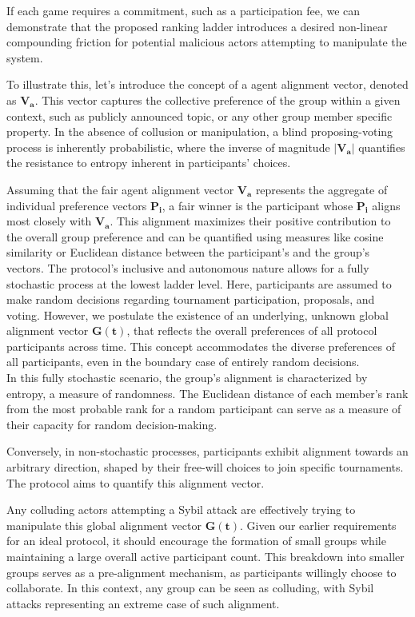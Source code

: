 \documentclass{article}
\begin{document}
\begin{CJK}{UTF8}{gbsn}
\begin{multicols}{2}
        If each game requires a commitment, such as a participation fee, we can demonstrate that the proposed ranking ladder introduces a desired non-linear compounding friction for potential malicious actors attempting to manipulate the system.

        To illustrate this, let's introduce the concept of a agent alignment vector, denoted as  $\mathbf{V_a}$. This vector captures the collective preference of the group within a given context, such as publicly announced topic, or any other group member specific property. In the absence of collusion or manipulation, a blind proposing-voting process is inherently probabilistic, where the inverse of magnitude $|\mathbf{V_a}|$ quantifies the resistance to entropy inherent in participants' choices.

        Assuming that the fair agent alignment vector $\mathbf{V_a}$  represents the aggregate of individual preference vectors $\mathbf{P_i}$, a fair winner is the participant whose  $\mathbf{P_i}$ aligns most closely with $\mathbf{V_a}$. This alignment maximizes their positive contribution to the overall group preference and can be quantified using measures like cosine similarity or Euclidean distance between the participant's and the group's vectors.
        The protocol's inclusive and autonomous nature allows for a fully stochastic process at the lowest ladder level. Here, participants are assumed to make random decisions regarding tournament participation, proposals, and voting.
        However, we postulate the existence of an underlying, unknown global alignment vector $\mathbf{G(t)}$, that reflects the overall preferences of all protocol participants across time. This concept accommodates the diverse preferences of all participants, even in the boundary case of entirely random decisions.\\
        In this fully stochastic scenario, the group's alignment is characterized by entropy, a measure of randomness. The Euclidean distance of each member's rank from the most probable rank for a random participant can serve as a measure of their capacity for random decision-making.

        Conversely, in non-stochastic processes, participants exhibit alignment towards an arbitrary direction, shaped by their free-will choices to join specific tournaments. The protocol aims to quantify this alignment vector.

        Any colluding actors attempting a Sybil attack are effectively trying to manipulate this global alignment vector $\mathbf{G(t)}$. Given our earlier requirements for an ideal protocol, it should encourage the formation of small groups while maintaining a large overall active participant count. This breakdown into smaller groups serves as a pre-alignment mechanism, as participants willingly choose to collaborate. In this context, any group can be seen as colluding, with Sybil attacks representing an extreme case of such alignment.


\end{multicols}
\end{CJK}
\end{document}
